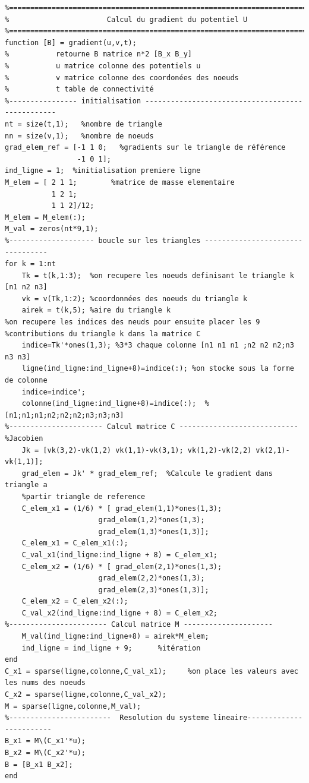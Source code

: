 \documentclass[a4paper,12pt,titlepage]{report}
\begin{document}
\begin{onehalfspace}
\begin{appendix}
\begin{verbatim}
%=========================================================================
%                       Calcul du gradient du potentiel U
%=========================================================================
function [B] = gradient(u,v,t);
%           retourne B matrice n*2 [B_x B_y]
%           u matrice colonne des potentiels u
%           v matrice colonne des coordonées des noeuds
%           t table de connectivité
%---------------- initialisation -------------------------------------------------
nt = size(t,1);   %nombre de triangle
nn = size(v,1);   %nombre de noeuds
grad_elem_ref = [-1 1 0;   %gradients sur le triangle de référence
                 -1 0 1];
ind_ligne = 1;  %initialisation premiere ligne
M_elem = [ 2 1 1;        %matrice de masse elementaire
	       1 2 1;
	       1 1 2]/12;
M_elem = M_elem(:);
M_val = zeros(nt*9,1);
%-------------------- boucle sur les triangles ---------------------------------
for k = 1:nt
	Tk = t(k,1:3);  %on recupere les noeuds definisant le triangle k  [n1 n2 n3]
    vk = v(Tk,1:2); %coordonnées des noeuds du triangle k   
    airek = t(k,5); %aire du triangle k
%on recupere les indices des neuds pour ensuite placer les 9
%contributions du triangle k dans la matrice C
    indice=Tk'*ones(1,3); %3*3 chaque colonne [n1 n1 n1 ;n2 n2 n2;n3 n3 n3] 
    ligne(ind_ligne:ind_ligne+8)=indice(:); %on stocke sous la forme de colonne
    indice=indice';                                 
    colonne(ind_ligne:ind_ligne+8)=indice(:);  %[n1;n1;n1;n2;n2;n2;n3;n3;n3]
%---------------------- Calcul matrice C ----------------------------
%Jacobien
	Jk = [vk(3,2)-vk(1,2) vk(1,1)-vk(3,1); vk(1,2)-vk(2,2) vk(2,1)-vk(1,1)];
	grad_elem = Jk' * grad_elem_ref;  %Calcule le gradient dans triangle a 
	%partir triangle de reference
	C_elem_x1 = (1/6) * [ grad_elem(1,1)*ones(1,3);
                      grad_elem(1,2)*ones(1,3);
                      grad_elem(1,3)*ones(1,3)];
	C_elem_x1 = C_elem_x1(:);
	C_val_x1(ind_ligne:ind_ligne + 8) = C_elem_x1;
	C_elem_x2 = (1/6) * [ grad_elem(2,1)*ones(1,3);
                      grad_elem(2,2)*ones(1,3);
                      grad_elem(2,3)*ones(1,3)];
	C_elem_x2 = C_elem_x2(:);
	C_val_x2(ind_ligne:ind_ligne + 8) = C_elem_x2;
%----------------------- Calcul matrice M ---------------------
	M_val(ind_ligne:ind_ligne+8) = airek*M_elem;
	ind_ligne = ind_ligne + 9;      %itération
end
C_x1 = sparse(ligne,colonne,C_val_x1);     %on place les valeurs avec les nums des noeuds
C_x2 = sparse(ligne,colonne,C_val_x2);
M = sparse(ligne,colonne,M_val);
%------------------------  Resolution du systeme lineaire------------------------
B_x1 = M\(C_x1'*u);
B_x2 = M\(C_x2'*u);
B = [B_x1 B_x2];
end
\end{verbatim}


\end{appendix}
\end{onehalfspace}
\end{document}

